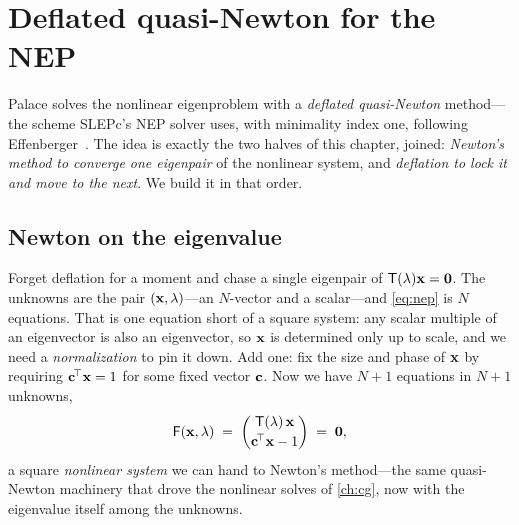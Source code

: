 \section{Deflated quasi-Newton for the NEP}
\label{sec:def-nleps}

Palace solves the nonlinear eigenproblem with a \emph{deflated quasi-Newton}
method---the scheme SLEPc's NEP solver uses, with minimality index one, following
Effenberger~\citep{effenberger2013}. The idea is exactly the two halves of this
chapter, joined: \emph{Newton's method to converge one eigenpair} of the
nonlinear system, and \emph{deflation to lock it and move to the next}. We build
it in that order.

\subsection{Newton on the eigenvalue}
\label{sec:def-newton}

Forget deflation for a moment and chase a single eigenpair of
$\mathsf{T}(\lambda)\mathbf{x}=\mathbf 0$. The unknowns are the pair $(\mathbf{x},\lambda)$---an
$N$-vector and a scalar---and \cref{eq:nep} is $N$ equations. That is one equation
short of a square system: any scalar multiple of an eigenvector is also an
eigenvector, so $\mathbf{x}$ is determined only up to scale, and we need a
\emph{normalization} to pin it down. Add one: fix the size and phase of $\mathbf{x}$ by
requiring $\mathbf{c}^{\!\top}\mathbf{x}=1$ for some fixed vector $\mathbf{c}$. Now we have $N+1$
equations in $N+1$ unknowns,
\begin{equation}
  \mathsf{F}(\mathbf{x},\lambda) \;=\;
  \begin{pmatrix} \mathsf{T}(\lambda)\,\mathbf{x} \\[2pt] \mathbf{c}^{\!\top}\mathbf{x} - 1 \end{pmatrix}
  \;=\; \mathbf 0,
  \label{eq:nep-system}
\end{equation}
a square \emph{nonlinear system} we can hand to Newton's method---the same
quasi-Newton machinery that drove the nonlinear solves of \cref{ch:cg}, now with
the eigenvalue itself among the unknowns.

